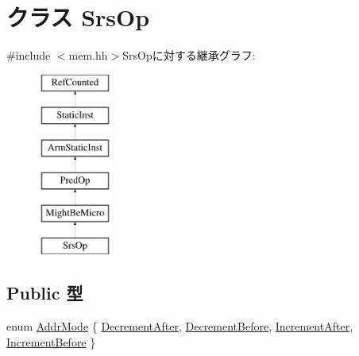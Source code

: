 \hypertarget{classArmISA_1_1SrsOp}{
\section{クラス SrsOp}
\label{classArmISA_1_1SrsOp}
}


{\ttfamily \#include $<$mem.hh$>$}SrsOpに対する継承グラフ:\begin{figure}[H]
\begin{center}
\leavevmode
\includegraphics[height=6cm]{classArmISA_1_1SrsOp}
\end{center}
\end{figure}
\subsection*{Public 型}
\begin{DoxyCompactItemize}
\item 
enum \hyperlink{classArmISA_1_1SrsOp_abf132b4ad93f3557cd3956577592ba68}{AddrMode} \{ \hyperlink{classArmISA_1_1SrsOp_abf132b4ad93f3557cd3956577592ba68a35a911245d73ba52065231cd0456ad9a}{DecrementAfter}, 
\hyperlink{classArmISA_1_1SrsOp_abf132b4ad93f3557cd3956577592ba68a4125a924b4656b5ef64eeb64874c081b}{DecrementBefore}, 
\hyperlink{classArmISA_1_1SrsOp_abf132b4ad93f3557cd3956577592ba68ac45778ec698a20485fe262a5b7f8b96e}{IncrementAfter}, 
\hyperlink{classArmISA_1_1SrsOp_abf132b4ad93f3557cd3956577592ba68adad42d0d2a9ba8285c2e852716985e19}{IncrementBefore}
 \}
\end{DoxyCompactItemize}
